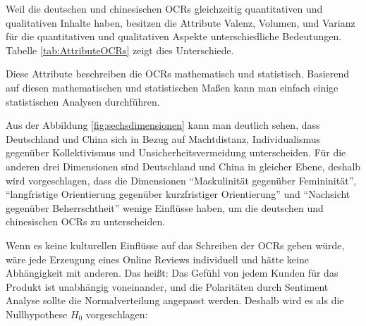 \begin{table}[htb]
\centering
{}
\caption[Die Attribute der quantitativen und qualitativen OCRs]{Die Attribute der quantitativen und qualitativen \ac{OCRs} (Quelle: eigene Darstellung)}
\label{tab:AttributeOCRs}
\end{table}

Weil die deutschen und chinesischen \ac{OCRs} gleichzeitig quantitativen und qualitativen Inhalte haben, besitzen die Attribute Valenz, Volumen, und Varianz für die quantitativen und qualitativen Aspekte unterschiedliche Bedeutungen. Tabelle \ref{tab:AttributeOCRs} zeigt dies Unterschiede.

Diese Attribute beschreiben die \ac{OCRs} mathematisch und statistisch. Basierend auf diesen mathematischen und statistischen Maßen kann man einfach einige statistischen Analysen durchführen.

Aus der Abbildung \ref{fig:sechsdimensionen} kann man deutlich sehen, dass Deutschland und China sich in Bezug auf Machtdistanz, Individualismus gegenüber Kollektivismus und Unsicherheitsvermeidung unterscheiden. Für die anderen drei Dimensionen sind Deutschland und China in gleicher Ebene, deshalb wird vorgeschlagen, dass die Dimensionen ``Maskulinität gegenüber Femininität'', ``langfristige Orientierung gegenüber kurzfristiger Orientierung'' und ``Nachsicht gegenüber Beherrschtheit'' wenige Einflüsse haben, um die deutschen und chinesischen \ac{OCRs} zu unterscheiden.

Wenn es keine kulturellen Einflüsse auf das Schreiben der \ac{OCRs} geben würde, wäre jede Erzeugung eines Online Reviews individuell und hätte keine Abhängigkeit mit anderen. Das heißt: Das Gefühl von jedem Kunden für das Produkt ist unabhängig voneinander, und die Polaritäten durch Sentiment Analyse sollte die Normalverteilung angepasst werden. %
Deshalb wird es als die Nullhypothese $H_0$ vorgeschlagen:

